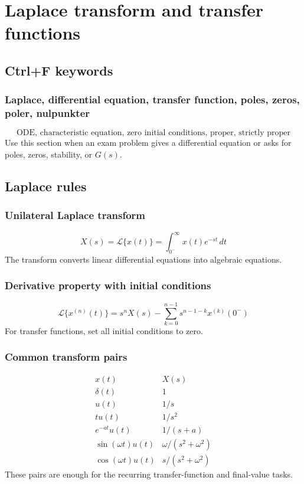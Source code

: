 \section{Laplace transform and transfer functions}

\subsection{Ctrl+F keywords}

\subsubsection{Laplace, differential equation, transfer function, poles, zeros, poler, nulpunkter}
\[
\text{ODE, characteristic equation, zero initial conditions, proper, strictly proper}
\]
Use this section when an exam problem gives a differential equation or asks for poles, zeros, stability, or \(G(s)\).

\subsection{Laplace rules}

\subsubsection{Unilateral Laplace transform}
\[
X(s)=\mathcal{L}\{x(t)\}=\int_{0^-}^{\infty}x(t)e^{-st}\,dt
\]
The transform converts linear differential equations into algebraic equations.

\subsubsection{Derivative property with initial conditions}
\[
\mathcal{L}\{x^{(n)}(t)\}=s^nX(s)-\sum_{k=0}^{n-1}s^{n-1-k}x^{(k)}(0^-)
\]
For transfer functions, set all initial conditions to zero.

\subsubsection{Common transform pairs}
\[
\begin{array}{c|c}
x(t) & X(s)\\ \hline
\delta(t) & 1\\
u(t) & 1/s\\
t u(t) & 1/s^2\\
e^{-at}u(t) & 1/(s+a)\\
\sin(\omega t)u(t) & \omega/(s^2+\omega^2)\\
\cos(\omega t)u(t) & s/(s^2+\omega^2)
\end{array}
\]
These pairs are enough for the recurring transfer-function and final-value tasks.

